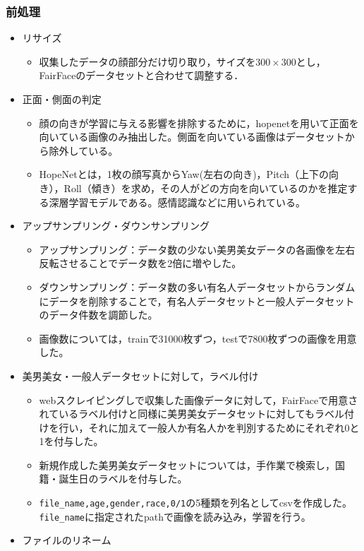 \documentclass[a4paper,11pt,titlepage]{jsarticle}
\begin{document}
\subsubsection{前処理}
\begin{itemize}
    \item リサイズ
        \begin{itemize}
            \item 収集したデータの顔部分だけ切り取り，サイズを$300 \times 300$とし，FairFaceのデータセットと合わせて調整する．
        \end{itemize}
    \item 正面・側面の判定
        \begin{itemize}
            \item 顔の向きが学習に与える影響を排除するために，hopenetを用いて正面を向いている画像のみ抽出した。側面を向いている画像はデータセットから除外している。
            \item HopeNetとは，1枚の顔写真からYaw(左右の向き)，Pitch（上下の向き），Roll（傾き）を求め，その人がどの方向を向いているのかを推定する深層学習モデルである。感情認識などに用いられている。
        \end{itemize}
    \item アップサンプリング・ダウンサンプリング
        \begin{itemize}
            \item アップサンプリング：データ数の少ない美男美女データの各画像を左右反転させることでデータ数を2倍に増やした。
            \item ダウンサンプリング：データ数の多い有名人データセットからランダムにデータを削除することで，有名人データセットと一般人データセットのデータ件数を調節した。
            \item 画像数については，trainで31000枚ずつ，testで7800枚ずつの画像を用意した。
        \end{itemize}
    \item 美男美女・一般人データセットに対して，ラベル付け
        \begin{itemize}
            \item webスクレイピングしで収集した画像データに対して，FairFaceで用意されているラベル付けと同様に美男美女データセットに対してもラベル付けを行い，それに加えて一般人か有名人かを判別するためにそれぞれ0と1を付与した。
            \item 新規作成した美男美女データセットについては，手作業で検索し，国籍・誕生日のラベルを付与した。
            \item \texttt{file\_name,age,gender,race,0/1}の5種類を列名としてcsvを作成した。\texttt{file\_name}に指定されたpathで画像を読み込み，学習を行う。
        \end{itemize}
    \item ファイルのリネーム
\end{itemize}
\end{document}
